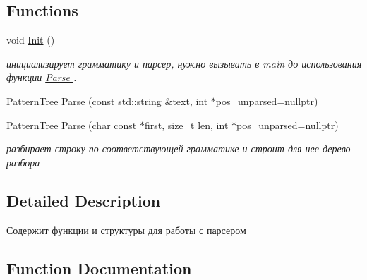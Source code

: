 \subsection*{Functions}
\begin{DoxyCompactItemize}
\item 
void \hyperlink{namespacetarget__parser_aabf89c1d99b04bac59515c8616155d94}{Init} ()\hypertarget{namespacetarget__parser_aabf89c1d99b04bac59515c8616155d94}{}\label{namespacetarget__parser_aabf89c1d99b04bac59515c8616155d94}

\begin{DoxyCompactList}\small\item\em инициализирует грамматику и парсер, нужно вызывать в main до использования функции \hyperlink{namespacetarget__parser_a3e0ffa10d4fd38f05986d81c0529fdc1}{Parse }. \end{DoxyCompactList}\item 
\hyperlink{classtarget__parser_1_1PatternTree}{Pattern\+Tree} \hyperlink{namespacetarget__parser_acbab48610c44fba004e282d8008df094}{Parse} (const std\+::string \&text, int $\ast$pos\+\_\+unparsed=nullptr)
\item 
\hyperlink{classtarget__parser_1_1PatternTree}{Pattern\+Tree} \hyperlink{namespacetarget__parser_a3e0ffa10d4fd38f05986d81c0529fdc1}{Parse} (char const $\ast$first, size\+\_\+t len, int $\ast$pos\+\_\+unparsed=nullptr)
\begin{DoxyCompactList}\small\item\em разбирает строку по соответствующей грамматике и строит для нее дерево разбора \end{DoxyCompactList}\end{DoxyCompactItemize}


\subsection{Detailed Description}
Содержит функции и структуры для работы с парсером 

\subsection{Function Documentation}
